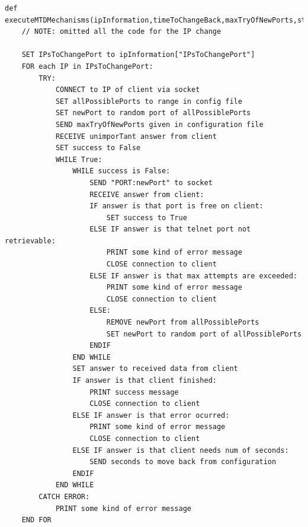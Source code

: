 \begin{lstlisting}[caption={The Code Block for Changing the Port of the Telnet Service on the Server Side From the \textit{letExecuteMTDMechanisms()} Function in Pseudocode. Everything Related to the IP Address Change has Been Ommited Here.},label={lst:Pseudocode sendToDevicesPort.py}]
def executeMTDMechanisms(ipInformation,timeToChangeBack,maxTryOfNewPorts,startOfPossiblePorts,endOfPossiblePorts):
    // NOTE: omitted all the code for the IP change
    
    SET IPsToChangePort to ipInformation["IPsToChangePort"]
    FOR each IP in IPsToChangePort:
        TRY:
            CONNECT to IP of client via socket
            SET allPossiblePorts to range in config file
            SET newPort to random port of allPossiblePorts
            SEND maxTryOfNewPorts given in configuration file
            RECEIVE unimporTant answer from client
            SET success to False
            WHILE True:
                WHILE success is False:
                    SEND "PORT:newPort" to socket
                    RECEIVE answer from client:
                    IF answer is that port is free on client:
                        SET success to True
                    ELSE IF answer is that telnet port not retrievable:
                        PRINT some kind of error message
                        CLOSE connection to client 
                    ELSE IF answer is that max attempts are exceeded:
                        PRINT some kind of error message
                        CLOSE connection to client 
                    ELSE:
                        REMOVE newPort from allPossiblePorts
                        SET newPort to random port of allPossiblePorts
                    ENDIF
                END WHILE 
                SET answer to received data from client
                IF answer is that client finished:
                    PRINT success message
                    CLOSE connection to client
                ELSE IF answer is that error ocurred:
                    PRINT some kind of error message
                    CLOSE connection to client
                ELSE IF answer is that client needs num of seconds:
                    SEND seconds to move back from configuration
                ENDIF       
            END WHILE
        CATCH ERROR:
            PRINT some kind of error message
    END FOR
\end{lstlisting}

